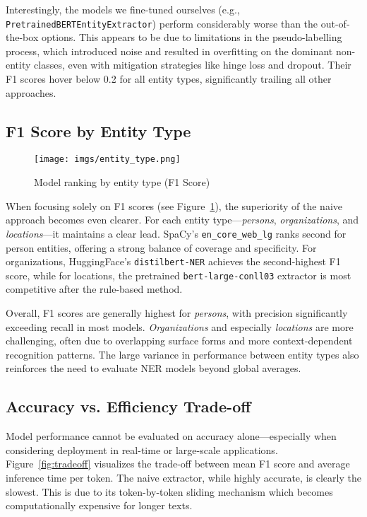 Interestingly, the models we fine-tuned ourselves (e.g., \texttt{PretrainedBERTEntityExtractor}) perform considerably worse than the out-of-the-box options. This appears to be due to limitations in the pseudo-labelling process, which introduced noise and resulted in overfitting on the dominant non-entity classes, even with mitigation strategies like hinge loss and dropout. Their F1 scores hover below 0.2 for all entity types, significantly trailing all other approaches.

\subsection{F1 Score by Entity Type}

\begin{figure}[htb]
    \centering
    \texttt{[image: imgs/entity\_type.png]}
    \caption{Model ranking by entity type (F1 Score)}
    \label{fig:ranking_f1}
\end{figure}


When focusing solely on F1 scores (see Figure~\ref{fig:ranking_f1}), the superiority of the naive approach becomes even clearer. For each entity type—\textit{persons}, \textit{organizations}, and \textit{locations}—it maintains a clear lead. SpaCy’s \texttt{en\_core\_web\_lg} ranks second for person entities, offering a strong balance of coverage and specificity. For organizations, HuggingFace’s \texttt{distilbert-NER} achieves the second-highest F1 score, while for locations, the pretrained \texttt{bert-large-conll03} extractor is most competitive after the rule-based method.

Overall, F1 scores are generally highest for \textit{persons}, with precision significantly exceeding recall in most models. \textit{Organizations} and especially \textit{locations} are more challenging, often due to overlapping surface forms and more context-dependent recognition patterns. The large variance in performance between entity types also reinforces the need to evaluate NER models beyond global averages.

\subsection{Accuracy vs. Efficiency Trade-off}

Model performance cannot be evaluated on accuracy alone—especially when considering deployment in real-time or large-scale applications. Figure~\ref{fig:tradeoff} visualizes the trade-off between mean F1 score and average inference time per token. The naive extractor, while highly accurate, is clearly the slowest. This is due to its token-by-token sliding mechanism which becomes computationally expensive for longer texts.

